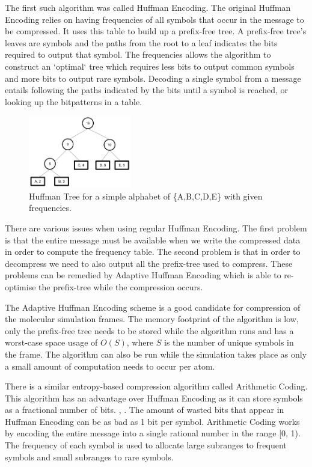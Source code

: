 \documentclass[a4paper,11pt]{report}
\begin{document}
The first such algorithm was called Huffman Encoding\cite{citeulike:1320251}. The original Huffman Encoding relies on having frequencies of all symbols that occur in the message to be compressed. It uses this table to build up a prefix-free tree. A prefix-free tree's leaves are symbols and the paths from the root to a leaf indicates the bits required to output that symbol. The frequencies allows the algorithm to construct an `optimal` tree which requires less bits to output common symbols and more bits to output rare symbols. Decoding a single symbol from a message  entails following the paths indicated by the bits until a symbol is reached, or looking up the bitpatterns in a table.

\begin{figure}
 \center
 \includegraphics[width=0.4\textwidth]{resources/HuffmanTreeCropped.png}
\caption{Huffman Tree for a simple alphabet of \{A,B,C,D,E\} with given frequencies.}
\label{huffman}
\end{figure}

There are various issues when using regular Huffman Encoding. The first problem is that the entire message must be available when we write the compressed data in order to compute the frequency table.\cite{RefWorks:1} The second problem is that in order to decompress we need to also output all the prefix-tree used to compress. These problems can be remedied by Adaptive Huffman Encoding\cite{42227} which is able to re-optimise the prefix-tree while the compression occurs.

The Adaptive Huffman Encoding scheme is a good candidate for compression of the molecular simulation frames. The memory footprint of the algorithm is low, only the prefix-free tree needs to be stored while the algorithm runs and has a worst-case space usage of $O(S)$, where $S$ is the number of unique symbols in the frame. The algorithm can also be run while the simulation takes place as only a small amount of computation needs to occur per atom.

There is a similar entropy-based compression algorithm called Arithmetic Coding. This algorithm has an advantage over Huffman Encoding as it can store symbols as a fractional number of bits. \cite{RefWorks:1}, \cite{RefWorks:3}. The amount of wasted bits that appear in Huffman Encoding can be as bad as 1 bit per symbol. Arithmetic Coding works by encoding the entire message into a single rational number in the range [0, 1). The frequency of each symbol is used to allocate large subranges to frequent symbols and small subranges to rare symbols. 
\end{document}
